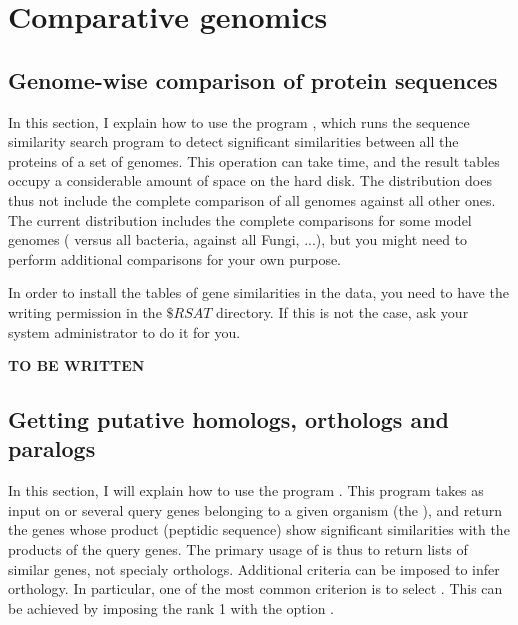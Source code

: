 \section{Comparative genomics}

\subsection{Genome-wise comparison of protein sequences}

In this section, I explain how to use the program
, which runs the sequence similarity search
program  to detect significant similarities between all
the proteins of a set of genomes. This operation can take time, and
the result tables occupy a considerable amount of space on the hard
disk. The \RSAT distribution does thus not include the complete
comparison of all genomes against all other ones. The current \RSAT
distribution includes the complete comparisons for some model genomes
( versus all bacteria,
 against all Fungi, ...), but you
might need to perform additional comparisons for your own purpose.

In order to install the tables of gene similarities in the \RSAT data,
you need to have the writing permission in the $\$RSAT$ directory. If
this is not the case, ask your system administrator to do it for you.

\textbf{TO BE WRITTEN}

\subsection{Getting putative homologs, orthologs and paralogs}

In this section, I will explain how to use the program
. This program takes as input on or several
query genes belonging to a given organism (the ), and return the genes whose product (peptidic sequence)
show significant similarities with the products of the query
genes. The primary usage of  is thus to return
lists of similar genes, not specialy orthologs. Additional criteria
can be imposed to infer orthology.  In particular, one of the most
common criterion is to select . This can be achieved by imposing the rank 1 with the option
.

